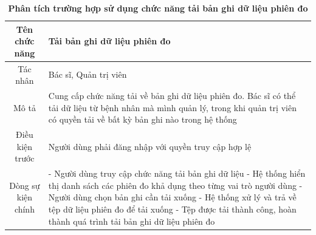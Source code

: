 \begin{table}[H]
	\caption{\bfseries \fontsize{12pt}{0pt}\selectfont Phân tích trường hợp sử dụng chức năng tải bản ghi dữ liệu phiên đo}
	\centering
	\begin{tabularx}{0.9\textwidth}{|c|X|}
		\hline
		\textbf{Tên chức năng} & \textbf{Tải bản ghi dữ liệu phiên đo}                                                                                                                                                 \\
		\hline
		Tác nhân               & Bác sĩ, Quản trị viên                                                                                                                                                                 \\
		\hline
		Mô tả                  & Cung cấp chức năng tải về bản ghi dữ liệu phiên đo. Bác sĩ có thể tải dữ liệu từ bệnh nhân mà mình quản lý, trong khi quản trị viên có quyền tải về bất kỳ bản ghi nào trong hệ thống \\
		\hline
		Điều kiện trước        & Người dùng phải đăng nhập với quyền truy cập hợp lệ                                                                                                                                   \\
		\hline
		Dòng sự kiện chính     &
		- Người dùng truy cập chức năng tải bản ghi dữ liệu \newline
		- Hệ thống hiển thị danh sách các phiên đo khả dụng theo từng vai trò người dùng \newline
		- Người dùng chọn bản ghi cần tải xuống \newline
		- Hệ thống xử lý và trả về tệp dữ liệu phiên đo để tải xuống \newline
		- Tệp được tải thành công, hoàn thành quá trình tải bản ghi dữ liệu phiên đo                                                                                                                                   \\
		\hline
	\end{tabularx}
\end{table}

